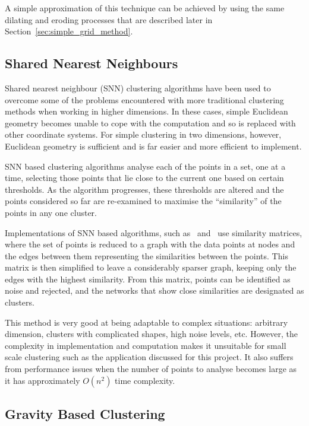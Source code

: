 A simple approximation of this technique can be achieved by using the same
dilating and eroding processes that are described later in
Section~\ref{sec:simple_grid_method}.

\subsection{Shared Nearest Neighbours}
\label{sub:shared_nearest_neighbours}

Shared nearest neighbour (SNN) clustering algorithms have been used to overcome
some of the problems encountered with more traditional clustering methods when
working in higher dimensions. In these cases, simple Euclidean geometry becomes
unable to cope with the computation and so is replaced with other coordinate
systems. For simple clustering in two dimensions, however, Euclidean geometry
is sufficient and is far easier and more efficient to implement.

SNN based clustering algorithms analyse each of the points in a set, one at a
time, selecting those points that lie close to the current one based on certain
thresholds. As the algorithm progresses, these thresholds are altered and the
points considered so far are re-examined to maximise the ``similarity'' of the
points in any one cluster.

Implementations of SNN based algorithms, such as~\cite{jarvis1973clustering}
and~\cite{ertoz2002new} use similarity matrices, where the set of points is
reduced to a graph with the data points at nodes and the edges between them
representing the similarities between the points. This matrix is then
simplified to leave a considerably sparser graph, keeping only the edges with
the highest similarity. From this matrix, points can be identified as noise and
rejected, and the networks that show close similarities are designated as
clusters.

This method is very good at being adaptable to complex situations: arbitrary
dimension, clusters with complicated shapes, high noise levels, etc. However,
the complexity in implementation and computation makes it unsuitable for small
scale clustering such as the application discussed for this project. It also
suffers from performance issues when the number of points to analyse becomes
large as it has approximately $O(n^2)$ time complexity.

\subsection{Gravity Based Clustering}
\label{sub:gravity_based_clustering}

